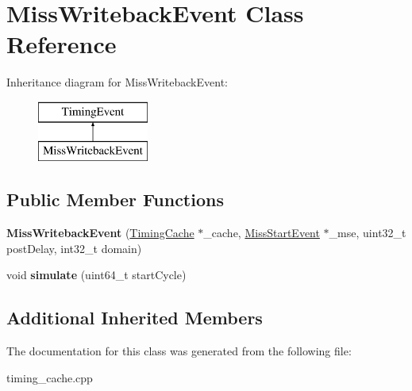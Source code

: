 \hypertarget{classMissWritebackEvent}{\section{Miss\-Writeback\-Event Class Reference}
\label{classMissWritebackEvent}
}
Inheritance diagram for Miss\-Writeback\-Event\-:\begin{figure}[H]
\begin{center}
\leavevmode
\includegraphics[height=2.000000cm]{classMissWritebackEvent}
\end{center}
\end{figure}
\subsection*{Public Member Functions}
\begin{DoxyCompactItemize}
\item 
\hypertarget{classMissWritebackEvent_a46dc94366945857eca7f8d3dbb8c05d3}{{\bfseries Miss\-Writeback\-Event} (\hyperlink{classTimingCache}{Timing\-Cache} $\ast$\-\_\-cache, \hyperlink{classMissStartEvent}{Miss\-Start\-Event} $\ast$\-\_\-mse, uint32\-\_\-t post\-Delay, int32\-\_\-t domain)}\label{classMissWritebackEvent_a46dc94366945857eca7f8d3dbb8c05d3}

\item 
\hypertarget{classMissWritebackEvent_a5741837d5b3af8641688057c4ac1651e}{void {\bfseries simulate} (uint64\-\_\-t start\-Cycle)}\label{classMissWritebackEvent_a5741837d5b3af8641688057c4ac1651e}

\end{DoxyCompactItemize}
\subsection*{Additional Inherited Members}


The documentation for this class was generated from the following file\-:\begin{DoxyCompactItemize}
\item 
timing\-\_\-cache.\-cpp\end{DoxyCompactItemize}
